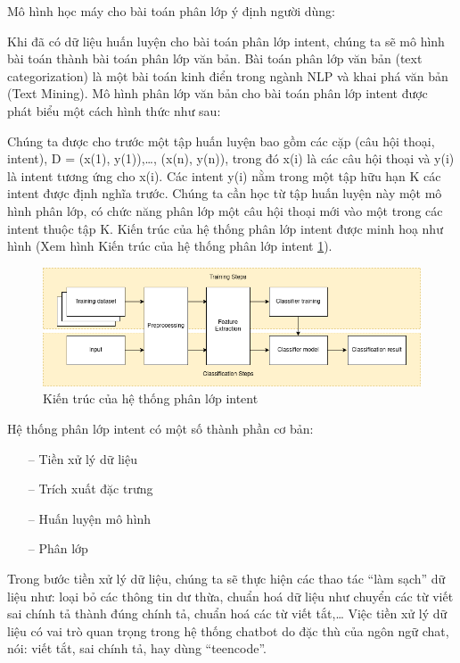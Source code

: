 Mô hình học máy cho bài toán phân lớp ý định người dùng:

Khi đã có dữ liệu huấn luyện cho bài toán phân lớp intent, chúng ta sẽ mô hình bài toán thành bài toán phân lớp văn bản. Bài toán phân lớp văn bản (text categorization) là một bài toán kinh điển trong ngành NLP và khai phá văn bản (Text Mining). Mô hình phân lớp văn bản cho bài toán phân lớp intent được phát biểu một cách hình thức như sau:

Chúng ta được cho trước một tập huấn luyện bao gồm các cặp (câu hội thoại, intent), D = {(x(1), y(1)),…, (x(n), y(n))}, trong đó x(i) là các câu hội thoại và y(i) là intent tương ứng cho x(i). Các intent y(i) nằm trong một tập hữu hạn K các intent được định nghĩa trước. Chúng ta cần học từ tập huấn luyện này một mô hình phân lớp, có chức năng phân lớp một câu hội thoại mới vào một trong các intent thuộc tập K. Kiến trúc của hệ thống phân lớp intent được minh hoạ như hình (Xem hình Kiến trúc của hệ thống phân lớp intent \ref{fig:system-class-intent}).
\begin{figure}[htp]
    \centering
    \includegraphics[width=15cm]{images/structure-system-class-intent.png}
    \caption{Kiến trúc của hệ thống phân lớp intent}
    \label{fig:system-class-intent}
\end{figure}

Hệ thống phân lớp intent có một số thành phần cơ bản:
\begin{itemize}
    \item[--] Tiền xử lý dữ liệu
    \item[--] Trích xuất đặc trưng
    \item[--] Huấn luyện mô hình
    \item[--] Phân lớp
\end{itemize}
Trong bước tiền xử lý dữ liệu, chúng ta sẽ thực hiện các thao tác “làm sạch” dữ liệu như: loại bỏ các thông tin dư thừa, chuẩn hoá dữ liệu như chuyển các từ viết sai chính tả thành đúng chính tả, chuẩn hoá các từ viết tắt,… Việc tiền xử lý dữ liệu có vai trò quan trọng trong hệ thống chatbot do đặc thù của ngôn ngữ chat, nói: viết tắt, sai chính tả, hay dùng “teencode”.

